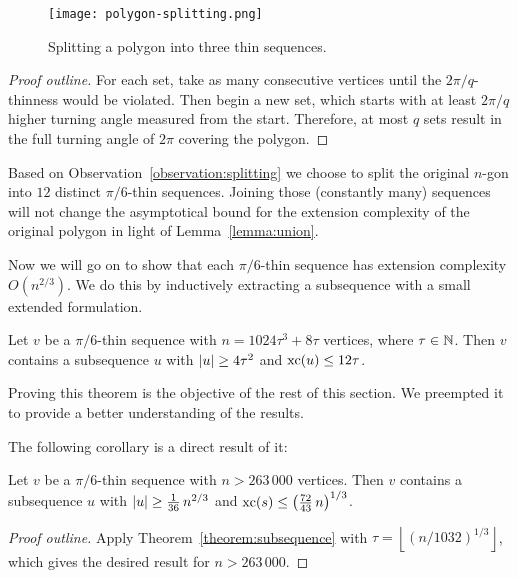 \begin{figure}[ht]
  \centering
  \texttt{[image: polygon-splitting.png]}
  \caption{Splitting a polygon into three thin sequences. \cite[Figure 4]{shitov2020sublinear}}
  \label{fig:polygon-splitting}
\end{figure}

\begin{proof}[Proof outline]
  For each set, take as many consecutive vertices until the $2\pi/q$-thinness would be violated. Then begin a new set, which starts with at least $2\pi/q$ higher turning angle measured from the start. Therefore, at most $q$ sets result in the full turning angle of $2\pi$ covering the polygon.
\end{proof}

Based on Observation~\ref{observation:splitting} we choose to split the original $n$-gon into $12$ distinct $\pi/6$-thin sequences. Joining those (constantly many) sequences will not change the asymptotical bound for the extension complexity of the original polygon in light of Lemma~\ref{lemma:union}.

Now we will go on to show that each $\pi/6$-thin sequence has extension complexity $O(n^{2/3})$. We do this by inductively extracting a subsequence with a small extended formulation.

\begin{theorem}\label{theorem:subsequence}
  Let $v$ be a $\pi/6$-thin sequence with $n = 1024\tau^3 + 8\tau$ vertices, where $\tau \in \mathbb{N}$.
  Then $v$ contains a subsequence $u$ with $\lvert u\rvert \geq 4\tau^2$ and $\operatorname{xc}(u) \leq 12\tau$.
\end{theorem}

Proving this theorem is the objective of the rest of this section. We preempted it to provide a better understanding of the results.

The following corollary is a direct result of it:

\begin{corollary}\label{corollary:subsequence}
  Let $v$ be a $\pi/6$-thin sequence with $n > 263\,000$ vertices.
  Then $v$ contains a subsequence $u$ with $\lvert u\rvert \geq \frac{1}{36}\,n^{2/3}$ and $\operatorname{xc}(s) \leq \left( \frac{72}{43}\,n \right)^{1/3}$.
\end{corollary}

\begin{proof}[Proof outline]
  Apply Theorem~\ref{theorem:subsequence} with $\tau=\left\lfloor (n/1032)^{1/3} \right\rfloor$, which gives the desired result for $n > 263\,000$.
\end{proof}

